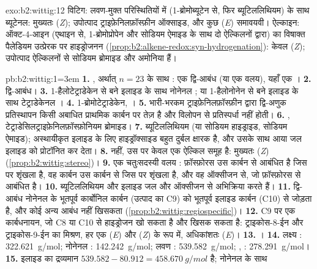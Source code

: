 \begin{solution}{exo:b2:wittig:12}
विटिग: लवण-मुक्त परिस्थितियों में  (1-ब्रोमोब्यूटेन से, फिर ब्यूटिललिथियम) के साथ ब्यूटेनल:
मुख्यतः (\textit{Z}); उपोत्पाद ट्राइफ़ेनिलफ़ॉस्फ़ीन ऑक्साइड, और कुछ (\textit{E}) समावयवी। ऐल्काइन:
ऑक्ट-4-आइन (एथाइन से, 1-ब्रोमोप्रोपेन और सोडियम ऐमाइड के साथ दो ऐल्किलनों द्वारा) का
विषाक्त पैलेडियम उत्प्रेरक पर हाइड्रोजनन (\cref{prop:b2:alkene-redox:syn-hydrogenation}): केवल (\textit{Z});
उपोत्पाद ऐल्किलनों से सोडियम ब्रोमाइड और अमोनिया हैं।
\end{solution}

\begin{solution}{pb:b2:wittig:1}\emergencystretch=3em
\textbf{1.} , अर्थात् $n = 23$ के साथ : एक द्वि-आबंध (या एक वलय), यहाँ एक
।
\textbf{2.}  द्वि-आबंध।
\textbf{3.} 1-हैलोटेट्राडेकेन से बने इलाइड के साथ नोनेनल ; या 1-हैलोनोनेन से बने इलाइड के साथ टेट्राडेकेनल
।
\textbf{4.} 1-ब्रोमोटेट्राडेकेन, ।
\textbf{5.} भारी-भरकम ट्राइफ़ेनिलफ़ॉस्फ़ीन द्वारा द्वि-अणुक प्रतिस्थापन किसी अबाधित प्राथमिक कार्बन पर तेज़ है
और विलोपन से प्रतिस्पर्धा नहीं होती।
\textbf{6.} , टेट्राडेसिलट्राइफ़ेनिलफ़ॉस्फ़ोनियम ब्रोमाइड।
\textbf{7.} ब्यूटिललिथियम (या सोडियम हाइड्राइड, सोडियम ऐमाइड); अस्थायीकृत इलाइड के लिए हाइड्रॉक्साइड बहुत दुर्बल
क्षारक है, और उसके साथ आया जल इलाइड को प्रोटॉनित कर देता।
\textbf{8.} नहीं, उस पर केवल एक ऐल्किल समूह है: मुख्यतः (\textit{Z}) (\cref{prop:b2:wittig:stereo})।
\textbf{9.} एक चतुःसदस्यी वलय : फ़ॉस्फ़ोरस उस कार्बन से आबंधित है जिस पर
 शृंखला है, वह कार्बन उस कार्बन से जिस पर  शृंखला है, और वह ऑक्सीजन से, जो
फ़ॉस्फ़ोरस से आबंधित है।
\textbf{10.} ब्यूटिललिथियम और इलाइड जल और ऑक्सीजन से अभिक्रिया करते हैं।
\textbf{11.} द्वि-आबंध नोनेनल के भूतपूर्व कार्बोनिल कार्बन (उत्पाद का C9) को भूतपूर्व
इलाइड कार्बन (C10) से जोड़ता है, और कोई अन्य आबंध नहीं खिसकता (\cref{prop:b2:wittig:regiospecific})।
\textbf{12.} C9 पर एक कार्बधनायन, जो C8 या C10 से हाइड्रोजन खो सकता है और खिसक सकता है:
ट्राइकोस-8-ईन और ट्राइकोस-9-ईन का मिश्रण, हर एक (\textit{E}) और (\textit{Z}) के रूप में, अधिकांशतः (\textit{E})।
\textbf{13.} ।
\textbf{14.} लक्ष्य : \qty{322.621}{g/mol}; नोनेनल : \qty{142.242}{g/mol}; लवण
: \qty{539.582}{g/mol}; , : \qty{278.291}{g/mol}।
\textbf{15.} इलाइड  का द्रव्यमान $539.582 - 80.912 = \qty{458.670}{g/mol}$ है; नोनेनल के साथ

\end{solution}
